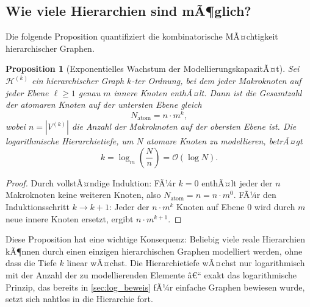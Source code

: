 ﻿\documentclass[12pt,a4paper,twoside]{article}
\theoremstyle{definition}
\theoremstyle{plain}
\newtheorem{proposition}[theorem]{Proposition}
\theoremstyle{remark}
\begin{document}
\subsection{Wie viele Hierarchien sind mÃ¶glich?}
\label{sub:kapazitaet}

Die folgende Proposition quantifiziert die kombinatorische MÃ¤chtigkeit
hierarchischer Graphen.

\begin{proposition}[Exponentielles Wachstum der ModellierungskapazitÃ¤t]
	\label{prop:wachstum}
	Sei $\mathcal{H}^{(k)}$ ein hierarchischer Graph $k$-ter Ordnung,
	bei dem jeder Makroknoten auf jeder Ebene $\ell \geq 1$ genau
	$m$ innere Knoten enthÃ¤lt.  Dann ist die Gesamtzahl der atomaren
	Knoten auf der untersten Ebene gleich
	\[
	N_{\text{atom}} = n \cdot m^k,
	\]
	wobei $n = |V^{(k)}|$ die Anzahl der Makroknoten auf der obersten
	Ebene ist.  Die logarithmische Hierarchietiefe, um $N$ atomare Knoten
	zu modellieren, betrÃ¤gt
	\[
	k = \log_m\!\left(\frac{N}{n}\right) = \mathcal{O}(\log N).
	\]
\end{proposition}

\begin{proof}
	Durch vollstÃ¤ndige Induktion: FÃ¼r $k=0$ enthÃ¤lt jeder der $n$
	Makroknoten keine weiteren Knoten, also $N_{\text{atom}} = n = n \cdot m^0$.
	FÃ¼r den Induktionsschritt $k \to k+1$: Jeder der $n \cdot m^k$ Knoten
	auf Ebene 0 wird durch $m$ neue innere Knoten ersetzt, ergibt
	$n \cdot m^{k+1}$.\qquad
\end{proof}

\noindent
Diese Proposition hat eine wichtige Konsequenz: Beliebig viele
reale Hierarchien kÃ¶nnen durch einen einzigen hierarchischen Graphen
modelliert werden, ohne dass die Tiefe $k$ linear wÃ¤chst.  Die
Hierarchietiefe wÃ¤chst nur logarithmisch mit der Anzahl der
zu modellierenden Elemente â€“ exakt das logarithmische Prinzip,
das bereits in \cref{sec:log_beweis} fÃ¼r einfache Graphen bewiesen
wurde, setzt sich nahtlos in die Hierarchie fort.
\end{document}
